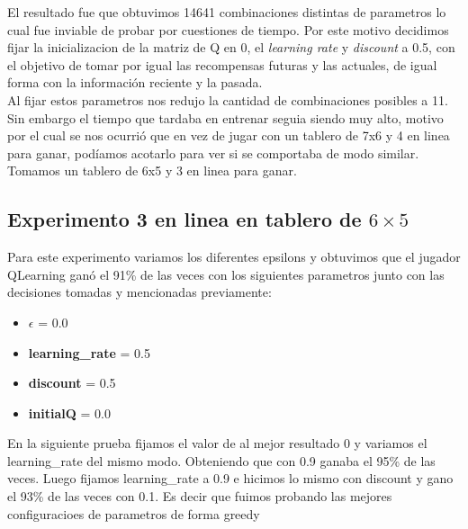 El resultado fue que obtuvimos 14641 combinaciones distintas de parametros lo cual fue inviable de probar por cuestiones
 de tiempo. Por este motivo decidimos fijar la inicializacion de la matriz de Q en 0, el \textit{learning rate} y
  \textit{discount} a 0.5, con el objetivo de tomar por igual las recompensas futuras y las actuales, de igual forma
   con la información reciente y la pasada. \\

Al fijar estos parametros nos redujo la cantidad de combinaciones posibles a 11. Sin embargo el tiempo que tardaba en entrenar
 seguia siendo muy alto, motivo por el cual se nos ocurrió que en vez de jugar con un tablero de 7x6 y 4 en linea para ganar,
  podíamos acotarlo para ver si se comportaba de modo similar. Tomamos un tablero de 6x5 y 3 en linea para ganar.



\subsection{Experimento 3 en linea en tablero de $6\times5$}
Para este experimento variamos los diferentes epsilons y obtuvimos que el jugador QLearning ganó el 91\% de las veces con los
siguientes parametros junto con las decisiones tomadas y mencionadas previamente: \\

\begin{itemize}
  \item  \textbf{$\epsilon$} = 0.0
  \item \textbf{learning\_rate} = 0.5
  \item \textbf{discount} = 0.5
  \item \textbf{initialQ} = 0.0
\end{itemize}



En la siguiente prueba fijamos el valor de \epsilon al mejor resultado 0 y  variamos el learning\_rate del mismo modo.
Obteniendo que con 0.9 ganaba el 95\% de las veces. Luego fijamos learning\_rate a 0.9 e hicimos lo mismo con discount y
gano el 93\% de las veces con 0.1. Es decir que fuimos probando las mejores configuracioes de parametros de forma greedy \\


